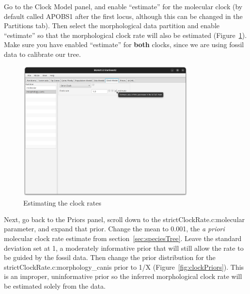 \documentclass[12pt]{article}
\begin{document}
Go to the Clock Model panel, and enable ``estimate'' for the
molecular clock (by default called APOBS1 after the first locus, although
this can be changed in the Partitions tab). Then select the morphological
data partition and enable ``estimate'' so that the morphological
clock rate will also be estimated (Figure~\ref{fig:estimateMorphClock}).
Make sure you have enabled ``estimate'' for \textbf{both} clocks, since we
are using fossil data to calibrate our tree.

\begin{figure}[htb!]
\centering
\includegraphics[width=0.8\textwidth]{figures/estimateMorphClock.png}
\caption
{Estimating the clock rates}
\label{fig:estimateMorphClock}
\end{figure}

Next, go back to the Priors panel, scroll down to the strictClockRate.c:molecular
parameter, and expand that prior. Change the mean to 0.001, the \textit{a
priori} molecular clock rate estimate from section~\ref{sec:speciesTree}.
Leave the standard deviation set at 1, a moderately informative prior that
will still allow the rate to be guided by the fossil data. Then change the
prior distribution for the strictClockRate.c:morphology\_canis prior to 1/X
(Figure~\ref{fig:clockPriors}). This is an improper, uninformative prior so
the inferred morphological clock rate will be estimated solely from the data.
\end{document}
